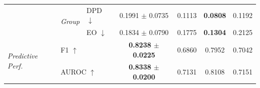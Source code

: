 \begin{table}[t]
\begin{tabular}{@{}lll cccc@{}}
  & \multirow{2}{*}{\scriptsize\textit{Group}} & DPD $\downarrow$ & 0.1991 $\pm$ 0.0735 & 0.1113 & \textbf{0.0808} & 0.1192 \\
  & & EO $\downarrow$ & 0.1834 $\pm$ 0.0790 & 0.1775 & \textbf{0.1304} & 0.2125 \\
\midrule
\multirow{2}{*}{\textit{Predictive Perf.}} & \multicolumn{2}{l}{F1 $\uparrow$} & \textbf{0.8238 $\pm$ 0.0225} & 0.6860 & 0.7952 & 0.7042 \\
  & \multicolumn{2}{l}{AUROC $\uparrow$} & \textbf{0.8338 $\pm$ 0.0200} & 0.7131 & 0.8108 & 0.7151 \\
\bottomrule
\end{tabular}
\end{table}